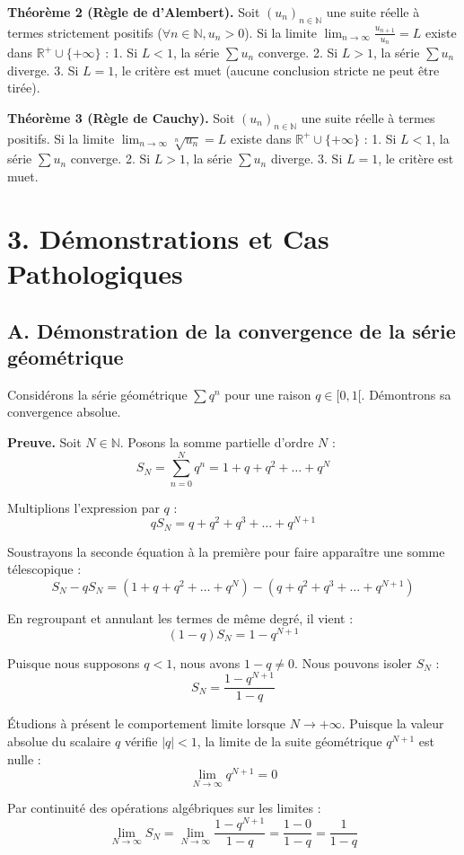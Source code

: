 \documentclass[12pt, a4paper]{article}
\begin{document}
\textbf{Théorème 2 (Règle de d'Alembert).}
Soit $(u_n)_{n \in \mathbb{N}}$ une suite réelle à termes strictement positifs ($\forall n \in \mathbb{N}, u_n > 0$).
Si la limite $\lim_{n \to \infty} \frac{u_{n+1}}{u_n} = L$ existe dans $\mathbb{R}^+ \cup \{+\infty\}$ :
1. Si $L < 1$, la série $\sum u_n$ converge.
2. Si $L > 1$, la série $\sum u_n$ diverge.
3. Si $L = 1$, le critère est muet (aucune conclusion stricte ne peut être tirée).

\textbf{Théorème 3 (Règle de Cauchy).}
Soit $(u_n)_{n \in \mathbb{N}}$ une suite réelle à termes positifs.
Si la limite $\lim_{n \to \infty} \sqrt[n]{u_n} = L$ existe dans $\mathbb{R}^+ \cup \{+\infty\}$ :
1. Si $L < 1$, la série $\sum u_n$ converge.
2. Si $L > 1$, la série $\sum u_n$ diverge.
3. Si $L = 1$, le critère est muet.

\section{3. Démonstrations et Cas Pathologiques}

\subsection{A. Démonstration de la convergence de la série géométrique}

Considérons la série géométrique $\sum q^n$ pour une raison $q \in [0, 1[$. Démontrons sa convergence absolue.

\textbf{Preuve.}
Soit $N \in \mathbb{N}$. Posons la somme partielle d'ordre $N$ :
$$S_N = \sum_{n=0}^N q^n = 1 + q + q^2 + \dots + q^N$$

Multiplions l'expression par $q$ :
$$q S_N = q + q^2 + q^3 + \dots + q^{N+1}$$

Soustrayons la seconde équation à la première pour faire apparaître une somme télescopique :
$$S_N - q S_N = (1 + q + q^2 + \dots + q^N) - (q + q^2 + q^3 + \dots + q^{N+1})$$

En regroupant et annulant les termes de même degré, il vient :
$$(1 - q) S_N = 1 - q^{N+1}$$

Puisque nous supposons $q < 1$, nous avons $1 - q \neq 0$. Nous pouvons isoler $S_N$ :
$$S_N = \frac{1 - q^{N+1}}{1 - q}$$

Étudions à présent le comportement limite lorsque $N \to +\infty$. Puisque la valeur absolue du scalaire $q$ vérifie $|q| < 1$, la limite de la suite géométrique $q^{N+1}$ est nulle :
$$\lim_{N \to \infty} q^{N+1} = 0$$

Par continuité des opérations algébriques sur les limites :
$$\lim_{N \to \infty} S_N = \lim_{N \to \infty} \frac{1 - q^{N+1}}{1 - q} = \frac{1 - 0}{1 - q} = \frac{1}{1 - q}$$
\end{document}
